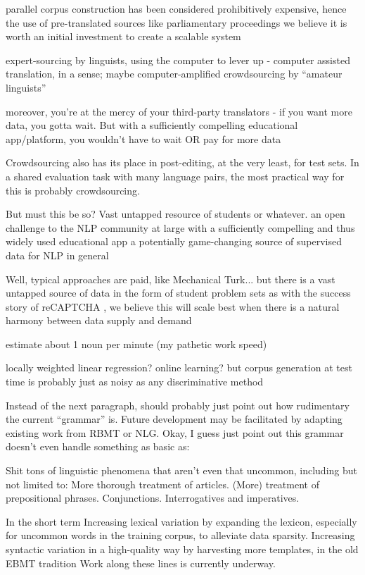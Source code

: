 parallel corpus construction has been considered prohibitively expensive, hence the use of pre-translated sources like parliamentary proceedings
we believe it is worth an initial investment to create a scalable system

expert-sourcing by linguists, using the computer to lever up - computer assisted translation, in a sense; maybe computer-amplified
crowdsourcing by ``amateur linguists''


moreover, you're at the mercy of your third-party translators - if you want more data, you gotta wait.
But with a sufficiently compelling educational app/platform, you wouldn't have to wait OR pay for more data

Crowdsourcing also has its place in post-editing, at the very least, for test sets.
In a shared evaluation task with many language pairs, the most practical way for this is probably crowdsourcing.

But must this be so? Vast untapped resource of students or whatever.
an open challenge to the NLP community at large
with a sufficiently compelling and thus widely used educational app 
a potentially game-changing source of supervised data for NLP in general

Well, typical approaches are paid, like Mechanical Turk... but there is a vast untapped source of data in the form of student problem sets
as with the success story of reCAPTCHA , we believe this will scale best when there is a natural harmony between data supply and demand


estimate about 1 noun per minute (my pathetic work speed)

locally weighted linear regression? online learning?
but corpus generation at test time is probably just as noisy as any discriminative method

Instead of the next paragraph, should probably just point out how rudimentary the current ``grammar'' is. 
Future development may be facilitated by adapting existing work from RBMT or NLG. 
Okay, I guess just point out this grammar doesn't even handle something as basic as:

Shit tons of linguistic phenomena that aren't even that uncommon, including but not limited to:
More thorough treatment of articles.
(More) treatment of prepositional phrases.
Conjunctions.
Interrogatives and imperatives.


In the short term
Increasing lexical variation by expanding the lexicon, especially for uncommon words in the training corpus, to alleviate data sparsity.
Increasing syntactic variation in a high-quality way by harvesting more templates, in the old EBMT tradition
Work along these lines is currently underway.


